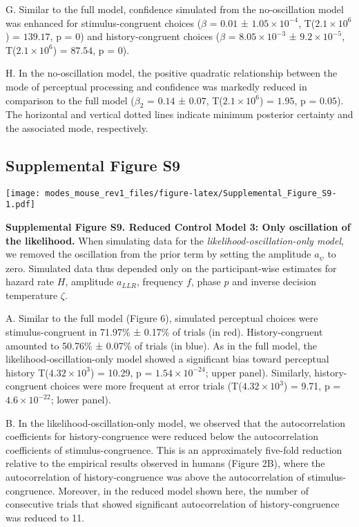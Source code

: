 \documentclass[
]{article}
\begin{document}
G. Similar to the full model, confidence simulated from the
no-oscillation model was enhanced for stimulus-congruent choices
(\(\beta\) = \(0.01\) ± \(\ensuremath{1.05\times 10^{-4}}\),
T(\(\ensuremath{2.1\times 10^{6}}\)) = \(139.17\), p = \(0\)) and
history-congruent choices (\(\beta\) =
\(\ensuremath{8.05\times 10^{-3}}\) ±
\(\ensuremath{9.2\times 10^{-5}}\), T(\(\ensuremath{2.1\times 10^{6}}\))
= \(87.54\), p = \(0\)).

H. In the no-oscillation model, the positive quadratic relationship
between the mode of perceptual processing and confidence was markedly
reduced in comparison to the full model (\(\beta_2\) = \(0.14\) ±
\(0.07\), T(\(\ensuremath{2.1\times 10^{6}}\)) = \(1.95\), p =
\(0.05\)). The horizontal and vertical dotted lines indicate minimum
posterior certainty and the associated mode, respectively.

\newpage

\hypertarget{supplemental-figure-s9}{%
\subsection{Supplemental Figure S9}\label{supplemental-figure-s9}}

\texttt{[image: modes\_mouse\_rev1\_files/figure-latex/Supplemental\_Figure\_S9-1.pdf]}

\textbf{Supplemental Figure S9. Reduced Control Model 3: Only
oscillation of the likelihood.} When simulating data for the
\emph{likelihood-oscillation-only model}, we removed the oscillation
from the prior term by setting the amplitude \(a_{\psi}\) to zero.
Simulated data thus depended only on the participant-wise estimates for
hazard rate \(H\), amplitude \(a_{LLR}\), frequency \(f\), phase \(p\)
and inverse decision temperature \(\zeta\).

A. Similar to the full model (Figure 6), simulated perceptual choices
were stimulus-congruent in 71.97\% ± 0.17\% of trials (in red).
History-congruent amounted to 50.76\% ± 0.07\% of trials (in blue). As
in the full model, the likelihood-oscillation-only model showed a
significant bias toward perceptual history
T(\ensuremath{4.32\times 10^{3}}) = 10.29, p =
\(\ensuremath{1.54\times 10^{-24}}\); upper panel). Similarly,
history-congruent choices were more frequent at error trials
(T(\ensuremath{4.32\times 10^{3}}) = 9.71, p =
\(\ensuremath{4.6\times 10^{-22}}\); lower panel).

B. In the likelihood-oscillation-only model, we observed that the
autocorrelation coefficients for history-congruence were reduced below
the autocorrelation coefficients of stimulus-congruence. This is an
approximately five-fold reduction relative to the empirical results
observed in humans (Figure 2B), where the autocorrelation of
history-congruence was above the autocorrelation of stimulus-congruence.
Moreover, in the reduced model shown here, the number of consecutive
trials that showed significant autocorrelation of history-congruence was
reduced to 11.
\end{document}
